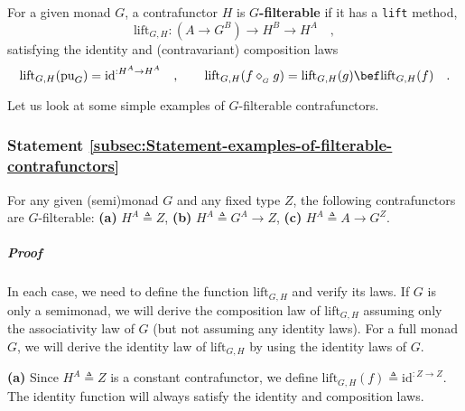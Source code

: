 For a given monad $G$, a contrafunctor $H$ is $G$\textbf{-filterable}
if it has a \lstinline!lift! method,
\[
\text{lift}_{G,H}:(A\rightarrow G^{B})\rightarrow H^{B}\rightarrow H^{A}\quad,
\]
satisfying the identity and (contravariant) composition laws
\[
\text{lift}_{G,H}(\text{pu}_{G})=\text{id}^{:H^{A}\rightarrow H^{A}}\quad,\quad\quad\text{lift}_{G,H}(f\diamond_{_{G}}g)=\text{lift}_{G,H}(g)\bef\text{lift}_{G,H}(f)\quad.
\]

Let us look at some simple examples of $G$-filterable contrafunctors.

\subsubsection{Statement \label{subsec:Statement-examples-of-filterable-contrafunctors}\ref{subsec:Statement-examples-of-filterable-contrafunctors}}

For any given (semi)monad $G$ and any fixed type $Z$, the following
contrafunctors are $G$-filterable: \textbf{(a)} $H^{A}\triangleq Z$,
\textbf{(b)} $H^{A}\triangleq G^{A}\rightarrow Z$, \textbf{(c)} $H^{A}\triangleq A\rightarrow G^{Z}$.

\subparagraph{Proof}

In each case, we need to define the function $\text{lift}_{G,H}$
and verify its laws. If $G$ is only a semimonad, we will derive the
composition law of $\text{lift}_{G,H}$ assuming only the associativity
law of $G$ (but not assuming any identity laws). For a full monad
$G$, we will derive the identity law of $\text{lift}_{G,H}$ by using
the identity laws of $G$. 

\textbf{(a)} Since $H^{A}\triangleq Z$ is a constant contrafunctor,
we define $\text{lift}_{G,H}(f)\triangleq\text{id}^{:Z\rightarrow Z}$.
The identity function will always satisfy the identity and composition
laws.

